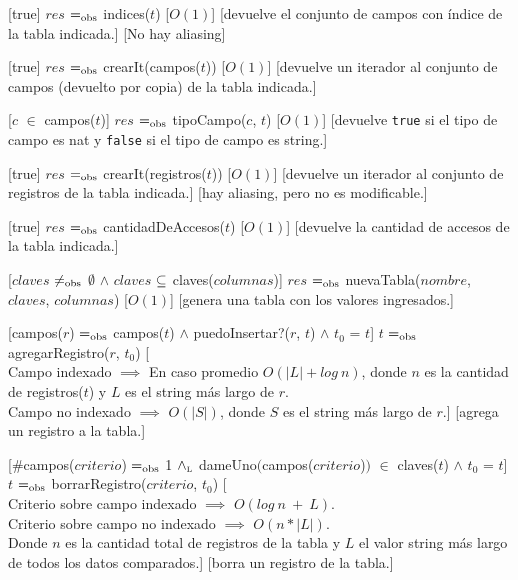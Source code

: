 \begin{Interfaz}
  [true]
  {$res$ $=_{\mathrm{obs}}$ indices($t$)}
  [$O(1)$]
  [devuelve el conjunto de campos con índice de la tabla indicada.]
  [No hay aliasing]

  [true]
  {$res$ $=_{\mathrm{obs}}$ crearIt(campos($t$))}
  [$O(1)$]
  [devuelve un iterador al conjunto de campos (devuelto por copia) de la tabla indicada.]


  [$c$ $\in$ campos($t$)]
  {$res$ $=_{\mathrm{obs}}$ tipoCampo($c$, $t$)}
  [$O(1)$]
  [devuelve \texttt{true} si el tipo de campo es nat y \texttt{false} si el tipo de campo es string.]

  [true]
  {$res$ $=_{\mathrm{obs}}$ crearIt(registros($t$))}
  [$O(1)$]
  [devuelve un iterador al conjunto de registros de la tabla indicada.]
  [hay aliasing, pero no es modificable.]

  [true]
  {$res$ $=_{\mathrm{obs}}$ cantidadDeAccesos($t$)}
  [$O(1)$]
  [devuelve la cantidad de accesos de la tabla indicada.]


  [$claves$ $\ne_{\mathrm{obs}}$ $\emptyset$ $\land$ $claves$ $\subseteq$ claves($columnas$)]
  {$res$ $=_{\mathrm{obs}}$ nuevaTabla($nombre$, $claves$, $columnas$)}
  [$O(1)$]
  [genera una tabla con los valores ingresados.]

  [campos($r$) $=_{\mathrm{obs}}$ campos($t$) $\land$ puedoInsertar?($r$, $t$) $\land$ $t_{0}$ = $t$]
  {$t$ $=_{\mathrm{obs}}$ agregarRegistro($r$, $t_0$)}
  [\\
\tab Campo indexado $\implies$ En caso promedio $O(|L| + log\ n)$, donde $n$ es la cantidad de registros($t$) y $L$ es el string más largo de $r$.\\
\tab Campo no indexado $\implies$ $O(|S|)$, donde $S$ es el string más largo de $r$.]
  [agrega un registro a la tabla.]

  [\#campos($criterio$) $=_{\mathrm{obs}}$ 1 $\land_{\mathrm{\scriptscriptstyle{L}}}$ dameUno$\big($campos($criterio$)$\big)$ $\in$ claves($t$) $\land$ $t_0$ = $t$]
  {$t$ $=_{\mathrm{obs}}$ borrarRegistro($criterio$, $t_0$)}
  [\\
\tab Criterio sobre campo indexado $\implies$ $O(log\ n\ +\ L)$. \\
\tab Criterio sobre campo no indexado $\implies$ $O(n * |L|)$. \\
\tab Donde $n$ es la cantidad total de registros de la tabla y $L$ el valor string más largo de todos los datos comparados.]
  [borra un registro de la tabla.]


\end{Interfaz}
